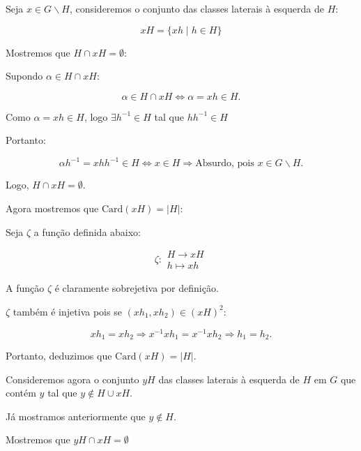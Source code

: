 \documentclass[16pt,openany]{book}
\theoremstyle{definition}
\begin{document}



Seja $x\in G \backslash H$, consideremos o conjunto das classes laterais à esquerda de $H$:

\[
xH = \{xh \; \vert \; h \in H\}
\]

Mostremos que $H\cap xH = \emptyset$:

Supondo $\alpha \in H\cap xH$:

\[
\alpha \in H\cap xH \iff \alpha = xh \in H.
\]

Como $\alpha =xh \in H$, logo $\exists h^{-1}\in H$ tal que $hh^{-1} \in H$

Portanto:

\[
\alpha h^{-1} = xhh^{-1} \in H \iff x \in H \Longrightarrow \text{Absurdo, pois   } x\in G\backslash H.
\]

Logo, $H\cap xH = \emptyset$.

Agora mostremos que $\text{Card}(xH) = \vert H\vert$:

Seja $\zeta$ a função definida abaixo:

\[
\zeta: 
\begin{array}{c}
H \to xH \\
h \mapsto xh
\end{array}
\]

A função $\zeta$ é claramente sobrejetiva por definição. 

$\zeta$ também é injetiva pois se $(xh_1, xh_2) \in (xH)^2$:

\[
xh_1 = xh_2 \Longrightarrow x^{-1}xh_1 = x^{-1}xh_2 \Longrightarrow h_1 = h_2.
\]

Portanto, deduzimos que $\text{Card}(xH) = \vert H\vert$.

Consideremos agora o conjunto $yH$ das classes laterais à esquerda de $H$ em $G$ que contém $y$ tal que $y \notin H\cup xH$.

Já mostramos anteriormente que $y \notin H$.

Mostremos que $yH \cap xH = \emptyset$
\end{document}
